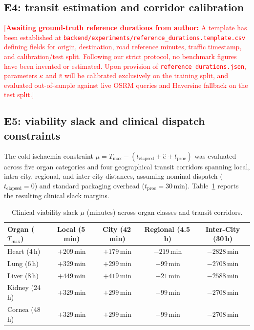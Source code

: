 \documentclass[journal]{IEEEtran}
\newcommand{\todo}[1]{\textcolor{red}{[#1]}}
\begin{document}
\subsection{E4: transit estimation and corridor calibration}
\todo{\textbf{Awaiting ground-truth reference durations from author:} A template has been established at \texttt{backend/experiments/reference\_durations.template.csv} defining fields for origin, destination, road reference minutes, traffic timestamp, and calibration/test split. Following our strict protocol, no benchmark figures have been invented or estimated. Upon provision of \texttt{reference\_durations.json}, parameters $\kappa$ and $\bar{v}$ will be calibrated exclusively on the training split, and evaluated out-of-sample against live OSRM queries and Haversine fallback on the test split.}

\subsection{E5: viability slack and clinical dispatch constraints}
The cold ischaemia constraint $\mu = T_{\max} - (t_{\mathrm{elapsed}} + \hat{e} + t_{\mathrm{proc}})$
was evaluated across five organ categories and four geographical transit corridors
spanning local, intra-city, regional, and inter-city distances, assuming nominal
dispatch ($t_{\mathrm{elapsed}}=0$) and standard packaging overhead ($t_{\mathrm{proc}}=30$\,min).
Table~\ref{tab:slack} reports the resulting clinical slack margins.

\begin{table}[t]
\centering
\caption{Clinical viability slack $\mu$ (minutes) across organ classes and transit corridors.}
\label{tab:slack}
\footnotesize
\setlength{\tabcolsep}{3pt}
\begin{tabular}{@{}lcccc@{}}
\toprule
Organ ($T_{\max}$) & Local (5\,min) & City (42\,min) & Regional (4.5\,h) & Inter-City (30\,h) \\
\midrule
Heart (4\,h) & $+209$\,min & $+179$\,min & $-219$\,min & $-2828$\,min \\
Lung (6\,h) & $+329$\,min & $+299$\,min & $-99$\,min & $-2708$\,min \\
Liver (8\,h) & $+449$\,min & $+419$\,min & $+21$\,min & $-2588$\,min \\
Kidney (24\,h) & $+329$\,min & $+299$\,min & $-99$\,min & $-2708$\,min \\
Cornea (48\,h) & $+329$\,min & $+299$\,min & $-99$\,min & $-2708$\,min \\
\bottomrule
\end{tabular}
\end{table}
\end{document}
